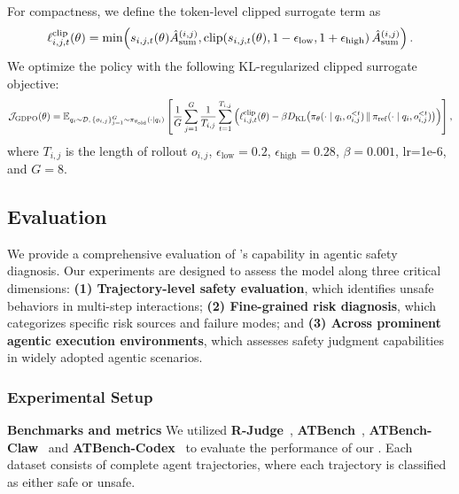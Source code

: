 For compactness, we define the token-level clipped surrogate term as
\begin{equation}
\small
\ell_{i,j,t}^{\mathrm{clip}}(\theta)
=
\min\!\left(
s_{i,j,t}(\theta)\hat A_{\mathrm{sum}}^{(i,j)},
\operatorname{clip}\!\left(
s_{i,j,t}(\theta),
1-\epsilon_{\mathrm{low}},
1+\epsilon_{\mathrm{high}}
\right)
\hat A_{\mathrm{sum}}^{(i,j)}
\right).
\label{eq:clipped-term}
\end{equation}
We optimize the policy with the following KL-regularized clipped
surrogate objective:
\begin{equation}
\small
\mathcal{J}_{\mathrm{GDPO}}(\theta)
=
\mathbb{E}_{q_i\sim\mathcal{D},\,\{o_{i,j}\}_{j=1}^{G}
\sim\pi_{\theta_{\mathrm{old}}}(\cdot\mid q_i)}
\left[
\frac{1}{G}\sum_{j=1}^{G}
\frac{1}{T_{i,j}}\sum_{t=1}^{T_{i,j}}
\left(
\ell_{i,j,t}^{\mathrm{clip}}(\theta)
-
\beta
D_{\mathrm{KL}}\!\left(
\pi_\theta(\cdot\mid q_i,o_{i,j}^{<t})
\,\|\, 
\pi_{\mathrm{ref}}(\cdot\mid q_i,o_{i,j}^{<t})
\right)
\right)
\right],
\label{eq:gdpo-objective}
\end{equation}
where $T_{i,j}$ is the length of rollout $o_{i,j}$,
$\epsilon_{\mathrm{low}}=0.2$, $\epsilon_{\mathrm{high}}=0.28$,
$\beta=0.001$, lr=1e-6, and $G=8$.

\subsection{Evaluation}
\label{subsec:evaluation}

We provide a comprehensive evaluation of \agentdog{}'s capability in agentic safety diagnosis. Our experiments are designed to assess the model along three critical dimensions: \textbf{(1) Trajectory-level safety evaluation}, which identifies unsafe behaviors in multi-step interactions; \textbf{(2) Fine-grained risk diagnosis}, which categorizes specific risk sources and failure modes; and \textbf{(3) Across prominent agentic execution environments}, which assesses safety judgment capabilities in widely adopted agentic scenarios.

\subsubsection{Experimental Setup}
\textbf{Benchmarks and metrics}
We utilized \textbf{R-Judge}~\citep{rjudge2024}, \textbf{ATBench}~\citep{li2026atbench}, \textbf{ATBench-Claw}~\citep{yang2026benchmarkstrajectorysafetyevaluation} and \textbf{ATBench-Codex}~\citep{yang2026benchmarkstrajectorysafetyevaluation} to evaluate the performance of our \agentdog{}. Each dataset consists of complete agent trajectories, where each trajectory is classified as either safe or unsafe. 

